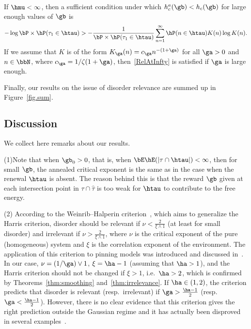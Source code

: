 \begin{prop}\label{LargeBetaRelevance}
If $\hmu < \infty$, then a sufficient condition under which $h_c^a(\gb) < h_c(\gb)$ for large enough values of $\gb$ is
\begin{equation}\label{RelAtInfty}
- \log \bP \times \hP(\tau_1 \in \htau) > - \frac{1}{\bP \times \hP(\tau_1 \in \htau)} \sum_{n=1}^\infty \hP(n \in \htau) K(n) \log K(n).
\end{equation}
If we assume that $K$ is of the form $K_\ga(n) = c_\ga n^{-(1 + \ga)}$ for all $\ga > 0$ and $n \in \bbN$, where $c_\ga = 1 / \zeta(1 + \ga)$, then~\eqref{RelAtInfty} is satisfied if $\ga$ is large enough.
\end{prop}

Finally, our results on the issue of disorder relevance are summed up in Figure~\ref{fig.sum}.

\subsection{Discussion}\label{sec2.3}

We collect here remarks about our results.

\medskip
\noindent (1)\enskip Note that when $\gb_0 > 0$, that is, when $\bE \hE(|\tau \cap \htau|) < \infty$, then for small $\gb$, the annealed critical exponent is the same as in the case when the renewal $\htau$ is absent. The reason behind this is that the reward $\gb$ given at each intersection point in $\tau \cap \hat\tau$ is too weak for $\htau$ to contribute to the free energy.

\medskip
\noindent (2)\enskip\label{seconditem}
According to the Weinrib--Halperin criterion~\cite{WH83}, which aims to generalize the Harris criterion, disorder should be relevant if $\nu < \frac{2}{\xi \wedge 1}$ (at least for small disorder) and irrelevant if $\nu > \frac{2}{\xi \wedge 1}$, where $\nu$ is the critical exponent of the pure (homogeneous) system and $\xi$ is the correlation exponent of the environment. The application of this criterion to pinning models was introduced and discussed in~\cite{B13}. In our case, $\nu = (1/\ga) \vee 1$, $\xi = \ha - 1$ (assuming that $\ha > 1$), and the Harris criterion should not be changed if $\xi >1$, i.e.~$\ha > 2$, which is confirmed by Theorems~\ref{thm:smoothing} and~\ref{thm:irrelevance}. If $\ha \in (1,2)$, the criterion predicts that disorder is relevant (resp.~irrelevant) if $\ga > \frac{\ha - 1}{2}$ (resp.~$\ga < \frac{\ha - 1}{2}$). However, there is no clear evidence that this criterion gives the right prediction outside the Gaussian regime and it has actually been disproved in several examples~\cite{B13, B14}.

